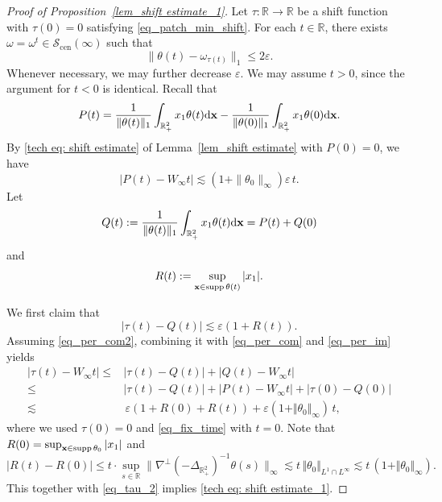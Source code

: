 \documentclass[11pt]{amsart}
\theoremstyle{definition}
\theoremstyle{definition}
\numberwithin{equation}{section}
\newcommand{\nrm}[1]{\Vert#1\Vert}
\newcommand{\supp}{{\mathrm{supp}}\,}
\newcommand{\0}{\emptyset}
\newcommand{\tht}{\theta}
\newcommand{\bfx}{{\bf x}}
\newcommand{\bbR}{\mathbb R}
\newcommand{\calS}{\mathcal S}
\newcommand{\dd}{\mathrm{d}}
\newcommand{\ift}{\infty}
\begin{document}
			\begin{proof}[Proof of Proposition~\ref{lem_shift estimate_1}]
				Let $\tau:\bbR\to\bbR$ be a shift function with $\tau(0)=0$ satisfying \eqref{eq_patch_min_shift}.
				For each $t \in \bbR$, there exists $\omega = \omega^t \in \calS_{\mathrm{cen}}(\infty)$ such that
				\begin{equation}
					\label{eq_fix_time}
					\| \theta(t) - \omega_{\tau(t)}\|_1 \leq 2\varepsilon.
				\end{equation}
                Whenever necessary, we may further decrease $\varepsilon$.
				We may assume $t > 0$, since the argument for $t < 0$ is identical.
				Recall that
				\[
				P(t) = \frac{1}{ \| \theta(t) \|_1  }\int_{\bbR^2_+}x_1\tht(t)\dd\bfx - \frac{1}{ \| \theta(0) \|_1  }\int_{\bbR^2_+}x_1\tht(0)\dd\bfx.
				\]
				By \eqref{tech eq: shift estimate} of Lemma~\ref{lem_shift estimate} with $P(0)=0$, we have
				\begin{equation}\label{eq_per_com}
					|P(t)-W_\ift t|\lesssim  (1 + \|\theta_0\|_{\infty})\varepsilon\, t.
				\end{equation}
				Let 
				\begin{equation}\label{eq_per_im}
					Q(t):=  \frac{1}{ \| \theta(t) \|_1  }\int_{\bbR^2_+}x_1\tht(t)\dd\bfx = P(t) + Q(0)
				\end{equation}
				and
				\begin{equation}\label{eq_width}
					R(t):=\sup_{\bfx\in\supp\tht(t)}|x_1|.
				\end{equation}
				
				\medskip
				
				\noindent We first claim that
				\begin{equation}
					\label{eq_per_com2}
					|\tau(t) - Q(t)| \lesssim\varepsilon(1 +  R(t)).
				\end{equation}
				Assuming \eqref{eq_per_com2}, combining it with \eqref{eq_per_com} and \eqref{eq_per_im} yields
                \begin{equation}\label{eq_tau_2}
				\begin{aligned}
					|\tau(t)-W_\ift t| \le   &  |\tau(t)-Q(t)| + |Q(t)-W_\ift t|  \\
					\le &|\tau(t)-Q(t)| + |P(t)-W_\ift t| + |\tau(0) - Q(0)| \\
					\lesssim &\,\varepsilon ( 1 + R(0) + R(t)) + \varepsilon(1+\nrm{\tht_0}_\ift)\, t,
				\end{aligned}
                \end{equation}
				where we used $\tau(0) = 0$ and \eqref{eq_fix_time} with $t=0$.
				Note that $R(0) = \sup_{\bfx \in \supp \theta_0}|x_1|$ and
				$$
				|R(t)-R(0)| \leq t \cdot\sup_{s\in\bbR} \| \nabla^{\perp}(-\Delta_{\bbR^2_+})^{-1}\theta(s)\|_{\infty} \lesssim t\,\nrm{\tht_0}_{L^1\cap L^\ift}
				\lesssim t\,(1+\nrm{\tht_0}_{\ift}).
				$$
				This together with \eqref{eq_tau_2} implies \eqref{tech eq: shift estimate_1}.
				

\end{proof}
\end{document}
